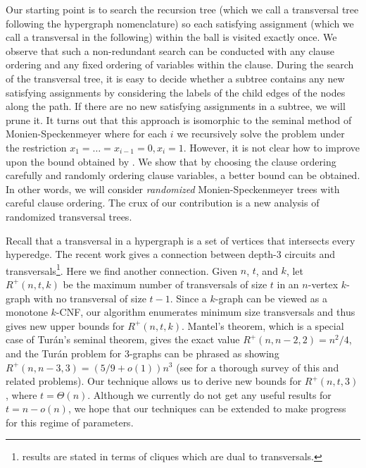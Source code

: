 \documentclass[10pt,a4paper]{article}
\begin{document}
\bigskip
Our starting point is to search
the recursion tree 
(which we call a transversal tree following the hypergraph nomenclature) 
so each satisfying assignment (which we call a transversal in the following) within the ball is visited exactly once.
We observe that such a non-redundant search can be conducted 
with any clause ordering and any fixed ordering of variables 
within the clause. During the search of the transversal tree, 
it is easy to decide whether 
a subtree contains any new satisfying assignments by considering 
the labels of the child edges of the nodes along the path.
If there are no new satisfying assignments in a subtree,  we will prune 
it.
It turns out that this approach is isomorphic to the 
seminal method of 
Monien-Speckenmeyer \cite{MonienS85} where for each $i$ we 
recursively solve the problem under the 
restriction $x_1 = \ldots = x_{i - 1} = 0, x_i = 1$. 
However, it is not clear
how to improve 
upon the bound obtained by \cite{MonienS85}.
We show that by choosing 
the clause ordering  carefully and randomly ordering 
clause variables, a better bound can be obtained. 
In other words, we will consider 
\emph{randomized} Monien-Speckenmeyer trees with careful clause ordering.
The crux of our contribution is a  new 
analysis of randomized transversal trees.


\bigskip
{} 
Recall that a transversal in a hypergraph is a set of 
vertices that intersects every hyperedge. 
The recent work \cite{FranklGT22} gives a connection 
between depth-3 circuits and 
transversals\footnote{\cite{FranklGT22} results 
are stated in terms of cliques which are dual to transversals.}. 
Here we find 
another connection. Given $n$, $t$, and $k$, 
let $R^+(n, t, k)$ be the maximum number of 
transversals of size $t$ in an $n$-vertex $k$-graph 
with no transversal of size $t - 1$. 
Since a $k$-graph can be viewed as a monotone $k$-CNF, our algorithm 
enumerates minimum size transversals and thus gives new upper 
bounds for $R^+(n, t, k)$. 
Mantel's theorem, which is a special case of 
Tur{\'a}n's seminal theorem, gives the 
exact value $R^+(n, n - 2, 2) = n^2/4$, 
and the Tur{\'a}n problem for 
3-graphs can be phrased as 
showing $R^+(n, n - 3, 3) = (5/9 + o(1))n^3$ 
(see \cite{MR2866732} for a thorough survey of this 
and related problems). Our technique allows us to derive 
new bounds for $R^+(n, t, 3)$, 
where $t = \Theta(n)$. 
Although we currently do not get any useful results 
for  $t = n - o(n)$, we hope that our techniques can be extended to make progress for
this regime of parameters.
\end{document}
